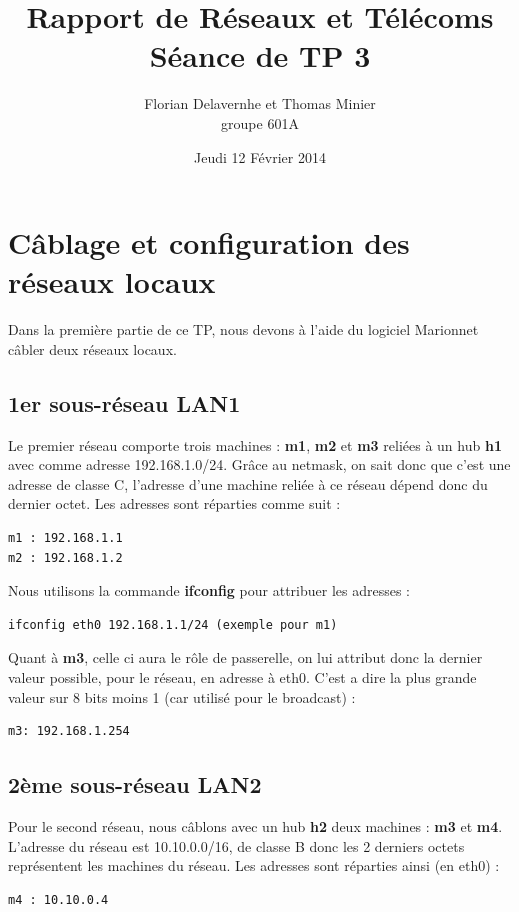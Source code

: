 \documentclass{article}
\title{Rapport de Réseaux et Télécoms \\ Séance de TP 3}
\author{Florian Delavernhe et Thomas Minier \\ groupe 601A}
\date{Jeudi 12 Février 2014}
\begin{document}
\maketitle
\vspace{5cm}
\tableofcontents
\newpage

\section{Câblage et configuration des réseaux locaux}

Dans la première partie de ce TP, nous devons à l'aide du logiciel Marionnet câbler deux réseaux locaux.

\subsection{1er sous-réseau LAN1}
Le premier réseau comporte trois machines : \textbf{m1}, \textbf{m2} et \textbf{m3} reliées à un hub \textbf{h1} avec comme adresse 192.168.1.0/24. Grâce au netmask, on sait donc que c'est une adresse de classe C, l'adresse d'une machine reliée à ce réseau dépend donc du dernier octet.
Les adresses sont réparties comme suit :
\begin{verbatim}
m1 : 192.168.1.1
m2 : 192.168.1.2
\end{verbatim}

Nous utilisons la commande \textbf{ifconfig} pour attribuer les adresses :
\begin{verbatim}
ifconfig eth0 192.168.1.1/24 (exemple pour m1)
\end{verbatim}

Quant à \textbf{m3}, celle ci aura le rôle de passerelle, on lui attribut donc la dernier valeur possible, pour le réseau, en adresse à eth0. C'est a dire la plus grande valeur sur 8 bits moins 1 (car utilisé pour le broadcast) :
\begin{verbatim}
m3: 192.168.1.254	
\end{verbatim}

\subsection{2ème sous-réseau LAN2}

Pour le second réseau, nous câblons avec un hub \textbf{h2} deux machines : \textbf{m3} et \textbf{m4}. L'adresse du réseau est 10.10.0.0/16, de classe B donc les 2 derniers octets représentent les machines du réseau. Les adresses sont réparties ainsi (en eth0) :
\begin{verbatim}
m4 : 10.10.0.4
\end{verbatim}
\end{document}
